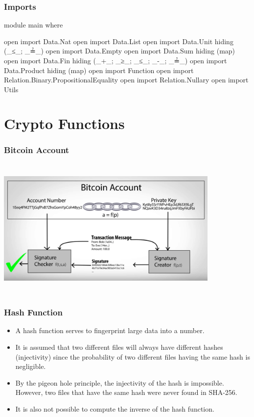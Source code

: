 \documentclass{beamer}
\begin{document}
\begin{frame}
  \frametitle{Imports}
\begin{code}

module main where

open import Data.Nat
open import Data.List
open import Data.Unit hiding (_≤_; _≟_)
open import Data.Empty
open import Data.Sum hiding (map)
open import Data.Fin hiding (_+_; _≥_; _≤_; _-_; _≟_)
open import Data.Product hiding (map)
open import Function
open import Relation.Binary.PropositionalEquality
open import Relation.Nullary
open import Utils

\end{code}
\end{frame}

\section{Crypto Functions}

\begin{frame}
  \frametitle{Bitcoin Account}
    \includegraphics[width=11cm, height=7cm]{privatekey}
\end{frame}

\begin{frame}
  \frametitle{Hash Function}
  \begin{itemize}
    \item A hash function serves to fingerprint large data into a number.
    \item It is assumed that two different files will always have different hashes (injectivity)
   since the probability of two different files having the same hash is negligible.
    \item By the pigeon hole principle, the injectivity of the hash is impossible.
      However, two files that have the same hash were never found in SHA-256.
    \item It is also not possible to compute the inverse of the hash function.
  \end{itemize}
\end{frame}
\end{document}
